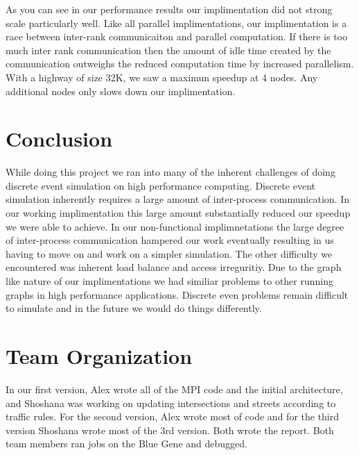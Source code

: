 \documentclass[10pt,a4paper]{article}
\begin{document}
As you can see in our performance results our implimentation did not strong scale
particularly well. Like all parallel implimentations, our implimentation is a race between inter-rank communicaiton and parallel computation. If there is too much inter rank communication then the amount of idle time created by the communication outweighs the reduced computation time by increased parallelism. With a highway of size 32K, we saw a maximun speedup at 4 nodes. Any additional nodes only slows down our implimentation.

\section{Conclusion}
While doing this project we ran into many of the inherent challenges of doing discrete event simulation on high performance computing. Discrete event simulation inherently requires a large amount of inter-process communication. In our working implimentation this large amount substantially reduced our speedup we were able to achieve. In our non-functional implimnetations the large degree of inter-process communication hampered our work eventually resulting in us having to move on and work on a simpler simulation. The other difficulty we encountered was inherent load balance and access irreguritiy. Due to the graph like nature of our implimentations we had similiar problems to other running graphs in high performance applications. Discrete even problems remain difficult to simulate and in the future we would do things differently.

\section{Team Organization}

In our first version, Alex wrote all of the MPI code and the initial architecture, and Shoshana was working on updating intersections and streets according to traffic rules. For the second version, Alex wrote most of code and for the third version Shoshana wrote most of the 3rd version. Both wrote the report. Both team members ran jobs on the Blue Gene and debugged.



\end{document}
